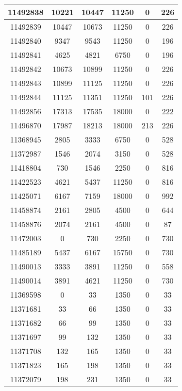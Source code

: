 \begin{appendices}
\begin{center}
\begin{longtable}{|c|c|c|c|c|c|}
11492838 & 10221 & 10447 & 11250 & 0     & 226 \\ \hline
11492839 & 10447 & 10673 & 11250 & 0     & 226 \\ \hline
11492840 & 9347  & 9543  & 11250 & 0     & 196 \\ \hline
11492841 & 4625  & 4821  & 6750  & 0     & 196 \\ \hline
11492842 & 10673 & 10899 & 11250 & 0     & 226 \\ \hline
11492843 & 10899 & 11125 & 11250 & 0     & 226 \\ \hline
11492844 & 11125 & 11351 & 11250 & 101   & 226 \\ \hline
11492856 & 17313 & 17535 & 18000 & 0     & 222 \\ \hline
11496870 & 17987 & 18213 & 18000 & 213   & 226 \\ \hline
11368945 & 2805  & 3333  & 6750  & 0     & 528 \\ \hline
11372987 & 1546  & 2074  & 3150  & 0     & 528 \\ \hline
11418804 & 730   & 1546  & 2250  & 0     & 816 \\ \hline
11422523 & 4621  & 5437  & 11250 & 0     & 816 \\ \hline
11425071 & 6167  & 7159  & 18000 & 0     & 992 \\ \hline
11458874 & 2161  & 2805  & 4500  & 0     & 644 \\ \hline
11458876 & 2074  & 2161  & 4500  & 0     & 87  \\ \hline
11472003 & 0     & 730   & 2250  & 0     & 730 \\ \hline
11485189 & 5437  & 6167  & 15750 & 0     & 730 \\ \hline
11490013 & 3333  & 3891  & 11250 & 0     & 558 \\ \hline
11490014 & 3891  & 4621  & 11250 & 0     & 730 \\ \hline
11369598 & 0     & 33    & 1350  & 0     & 33  \\ \hline
11371681 & 33    & 66    & 1350  & 0     & 33  \\ \hline
11371682 & 66    & 99    & 1350  & 0     & 33  \\ \hline
11371697 & 99    & 132   & 1350  & 0     & 33  \\ \hline
11371708 & 132   & 165   & 1350  & 0     & 33  \\ \hline
11371823 & 165   & 198   & 1350  & 0     & 33  \\ \hline
11372079 & 198   & 231   & 1350  & 0     & 33  \\ \hline

\end{longtable}
\end{center}
\end{appendices}
